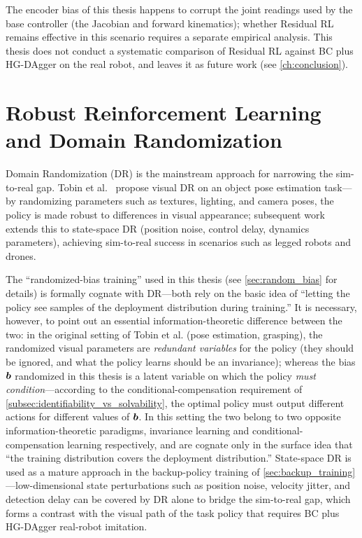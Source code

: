 The encoder bias of this thesis happens to corrupt the joint readings used by the base controller (the Jacobian and forward kinematics); whether Residual RL remains effective in this scenario requires a separate empirical analysis. This thesis does not conduct a systematic comparison of Residual RL against BC plus HG-DAgger on the real robot, and leaves it as future work (see \cref{ch:conclusion}).

\section{Robust Reinforcement Learning and Domain Randomization}\label{sec:robust_rl_dr}

Domain Randomization (DR) is the mainstream approach for narrowing the sim-to-real gap. Tobin et al.~\cite{tobin2017domain} propose visual DR on an object pose estimation task---by randomizing parameters such as textures, lighting, and camera poses, the policy is made robust to differences in visual appearance; subsequent work extends this to state-space DR (position noise, control delay, dynamics parameters), achieving sim-to-real success in scenarios such as legged robots and drones.

The ``randomized-bias training'' used in this thesis (see \cref{sec:random_bias} for details) is formally cognate with DR---both rely on the basic idea of ``letting the policy see samples of the deployment distribution during training.'' It is necessary, however, to point out an essential information-theoretic difference between the two: in the original setting of Tobin et al. (pose estimation, grasping), the randomized visual parameters are \emph{redundant variables} for the policy (they should be ignored, and what the policy learns should be an invariance); whereas the bias $\bm{b}$ randomized in this thesis is a latent variable on which the policy \emph{must condition}---according to the conditional-compensation requirement of \cref{subsec:identifiability_vs_solvability}, the optimal policy must output different actions for different values of $\bm{b}$. In this setting the two belong to two opposite information-theoretic paradigms, invariance learning and conditional-compensation learning respectively, and are cognate only in the surface idea that ``the training distribution covers the deployment distribution.'' State-space DR is used as a mature approach in the backup-policy training of \cref{sec:backup_training}---low-dimensional state perturbations such as position noise, velocity jitter, and detection delay can be covered by DR alone to bridge the sim-to-real gap, which forms a contrast with the visual path of the task policy that requires BC plus HG-DAgger real-robot imitation.

